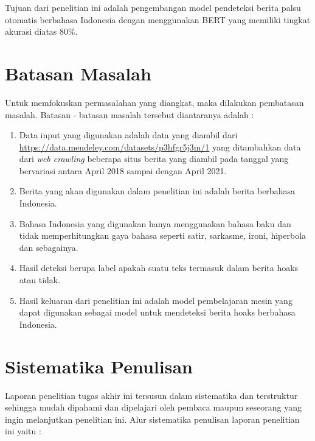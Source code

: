 Tujuan dari penelitian ini adalah pengembangan model pendeteksi berita palsu otomatis berbahasa Indonesia dengan menggunakan BERT yang memiliki tingkat akurasi diatas 80\%.

\section{Batasan Masalah}
\label{sec:batasanmasalah}

Untuk memfokuskan permasalahan yang diangkat, maka dilakukan pembatasan masalah. Batasan - batasan masalah tersebut diantaranya adalah :

\begin{enumerate}[itemsep=-0.2em]
      \item Data input yang digunakan adalah data yang diambil dari \url{https://data.mendeley.com/datasets/p3hfgr5j3m/1} yang ditambahkan data dari \textit{web crawling} beberapa situs berita yang diambil pada tanggal yang bervariasi antara April 2018 sampai dengan April 2021.

      \item Berita yang akan digunakan dalam penelitian ini adalah berita berbahasa Indonesia.

      \item Bahasa Indonesia yang digunakan hanya menggunakan bahasa baku dan tidak memperhitungkan gaya bahasa seperti satir, sarkasme, ironi, hiperbola dan sebagainya.

      \item Hasil deteksi berupa label apakah suatu teks termasuk dalam berita hoaks atau tidak.

      \item Hasil keluaran dari penelitian ini adalah model pembelajaran mesin yang dapat digunakan sebagai model untuk mendeteksi berita hoaks berbahasa Indonesia.

\end{enumerate}

\section{Sistematika Penulisan}
\label{sec:sistematikapenulisan}

Laporan penelitian tugas akhir ini tersusun dalam sistematika dan terstruktur sehingga mudah dipahami dan dipelajari oleh pembaca maupun seseorang yang ingin melanjutkan penelitian ini. Alur sistematika penulisan laporan penelitian ini yaitu :

